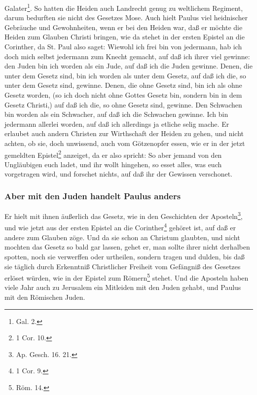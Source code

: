 Galater\footnote{Gal. 2.}. So hatten die Heiden auch Landrecht genug zu weltlichem Regiment, darum bedurften sie nicht des Gesetzes Mose. Auch hielt Paulus viel heidnischer Gebräuche und Gewohnheiten, wenn er bei den Heiden war, daß er möchte die Heiden zum Glauben Christi bringen, wie da stehet in der ersten Epistel an die Corinther, da St. Paul also saget: Wiewohl ich frei bin von jedermann, hab ich doch mich selbst jedermann zum Knecht gemacht, auf daß ich ihrer viel gewinne: den Juden bin ich worden als ein Jude, auf daß ich die Juden gewinne. Denen, die unter dem Gesetz sind, bin ich worden als unter dem Gesetz, auf daß ich die, so unter dem Gesetz sind, gewinne. Denen, die ohne Gesetz sind, bin ich als ohne Gesetz worden, (so ich doch nicht ohne Gottes Gesetz bin, sondern bin in dem Gesetz Christi,) auf daß ich die, so ohne Gesetz sind, gewinne. Den Schwachen bin worden als ein Schwacher, auf daß ich die Schwachen gewinne. Ich bin jedermann allerlei worden, auf daß ich allerdings ja etliche selig mache. Er erlaubet auch andern Christen zur Wirthschaft der Heiden zu gehen, und nicht achten, ob sie, doch unwissend, auch vom Götzenopfer essen, wie er in der jetzt gemeldten Epistel\footnote{1 Cor. 10.} anzeiget, da er also spricht: So aber jemand von den Ungläubigen euch ladet, und ihr wollt hingehen, so esset alles, was euch vorgetragen wird, und forschet nichts, auf daß ihr der Gewissen verschonet.

\subsubsection[Aber mit den Juden]{Aber mit den Juden handelt Paulus anders}

Er hielt mit ihnen äußerlich das Gesetz, wie in den Geschichten der Aposteln\footnote{Ap. Gesch. 16. 21.}, und wie jetzt aus der ersten Epistel an die Corinther\footnote{1 Cor. 9.} gehöret ist, auf daß er andere zum Glauben zöge. Und da sie schon an Christum glaubten, und nicht mochten das Gesetz so bald gar lassen, gehet er, man sollte ihrer nicht derhalben spotten, noch sie verwerffen oder urtheilen, sondern tragen und dulden, bis daß sie täglich durch
Erkenntniß Christlicher Freiheit vom Gefängniß des Gesetzes erlöset würden, wie in der Epistel zum Römern\footnote{Röm. 14.} stehet. Und die Aposteln haben viele Jahr auch zu Jerusalem ein Mitleiden mit den Juden gehabt, und Paulus mit den Römischen Juden.

